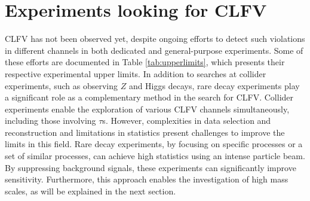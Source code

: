\section{Experiments looking for CLFV}
CLFV has not been observed yet, despite ongoing efforts to detect such violations in different channels in both dedicated and general-purpose experiments. 
Some of these efforts are documented in Table \ref{tab:upperlimits}, which presents their respective experimental upper limits. 
In addition to searches at collider experiments, such as observing $Z$ and 
Higgs decays, rare decay experiments play a significant role as a complementary method in the search for CLFV. 
Collider experiments enable the exploration of various CLFV channels simultaneously, including those involving $\tau$s. 
However, complexities in data selection and reconstruction and limitations in statistics present challenges to improve the limits in this field.
Rare decay experiments, by focusing on specific processes or a set of similar processes, can achieve high statistics using an intense particle beam. 
By suppressing background signals, these experiments can significantly improve sensitivity. Furthermore, this approach 
enables the investigation of high mass scales, as will be explained in the next section. 
